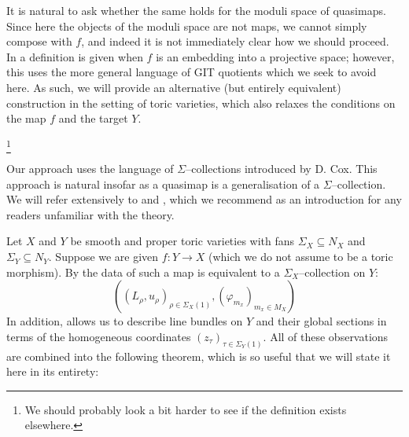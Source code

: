 \documentclass[11pt]{amsart}
\renewcommand{\to}{\rightarrow}
\theoremstyle{plain}
\theoremstyle{definition}
\begin{document}
It is natural to ask whether the same holds for the moduli space of quasimaps. Since here the objects of the moduli space are not maps, we cannot simply compose with $f$, and indeed it is not immediately clear how we should proceed. In \cite[Section 3.1]{CF-K-wallcrossing} a definition is given when $f$ is an embedding into a projective space; however, this uses the more general language of GIT quotients which we seek to avoid here. As such, we will provide an alternative (but entirely equivalent) construction in the setting of toric varieties, which also relaxes the conditions on the map $f$ and the target $Y$.

\footnote{We should probably look a bit harder to see if the definition exists elsewhere.}

Our approach uses the language of $\Sigma$--collections introduced by D. Cox. This approach is natural insofar as a quasimap is a generalisation of a $\Sigma$--collection. We will refer extensively to \cite{CoxRing} and \cite{CoxFunctor}, which we recommend as an  introduction for any readers unfamiliar with the theory.

Let $X$ and $Y$ be smooth and proper toric varieties with fans $\Sigma_X \subseteq N_X$ and $\Sigma_Y \subseteq N_Y$. Suppose we are given $f : Y \to X$ (which we do not assume to be a toric morphism). By \cite[Theorem 1.1]{CoxFunctor} the data of such a map is equivalent to a $\Sigma_X$--collection on $Y$:
\begin{equation*} ( (L_\rho, u_\rho)_{\rho \in \Sigma_X(1)}, (\varphi_{m_x})_{m_x \in M_X} ) \end{equation*}
In addition, \cite{CoxRing} allows us to describe line bundles on $Y$ and their global sections in terms of the homogeneous coordinates $(z_\tau)_{\tau \in \Sigma_Y(1)}$. All of these observations are combined into the following theorem, which is so useful that we will state it here in its entirety:
\end{document}
